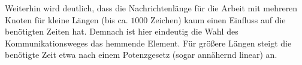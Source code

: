 Weiterhin wird deutlich, dass die Nachrichtenlänge für die Arbeit mit mehreren
Knoten für kleine Längen (bis ca. $1000$ Zeichen) kaum einen Einfluss auf die
benötigten Zeiten hat. Demnach ist hier eindeutig die Wahl des Kommunikationsweges
das hemmende Element. Für größere Längen steigt die benötigte Zeit etwa nach einem 
Potenzgesetz (sogar annähernd linear) an. 